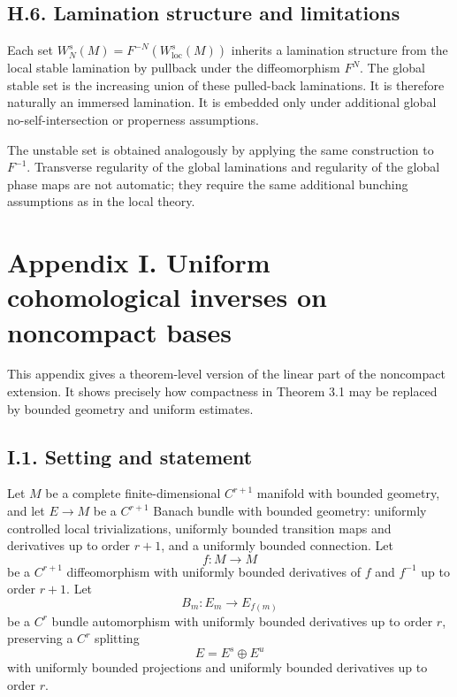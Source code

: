 \documentclass[12pt,a4paper]{article}
\theoremstyle{plain}
\numberwithin{equation}{section}
\numberwithin{theorem}{section}
\begin{document}
\subsection{H.6. Lamination structure and limitations}

Each set $W_N^s(M)=F^{-N}(W^s_{\mathrm{loc}}(M))$ inherits a lamination structure from the local stable lamination by pullback under the diffeomorphism $F^N$. The global stable set is the increasing union of these pulled-back laminations. It is therefore naturally an immersed lamination. It is embedded only under additional global no-self-intersection or properness assumptions.

The unstable set is obtained analogously by applying the same construction to $F^{-1}$. Transverse regularity of the global laminations and regularity of the global phase maps are not automatic; they require the same additional bunching assumptions as in the local theory.

\clearpage

\section{Appendix I. Uniform cohomological inverses on noncompact bases}

This appendix gives a theorem-level version of the linear part of the noncompact extension. It shows precisely how compactness in Theorem 3.1 may be replaced by bounded geometry and uniform estimates.

\subsection{I.1. Setting and statement}

Let $M$ be a complete finite-dimensional $C^{r+1}$ manifold with bounded geometry, and let $E\to M$ be a $C^{r+1}$ Banach bundle with bounded geometry: uniformly controlled local trivializations, uniformly bounded transition maps and derivatives up to order $r+1$, and a uniformly bounded connection. Let
\[
f:M\to M
\]
be a $C^{r+1}$ diffeomorphism with uniformly bounded derivatives of $f$ and $f^{-1}$ up to order $r+1$. Let
\[
B_m:E_m\to E_{f(m)}
\]
be a $C^r$ bundle automorphism with uniformly bounded derivatives up to order $r$, preserving a $C^r$ splitting
\[
E=E^s\oplus E^u
\]
with uniformly bounded projections and uniformly bounded derivatives up to order $r$.
\end{document}
